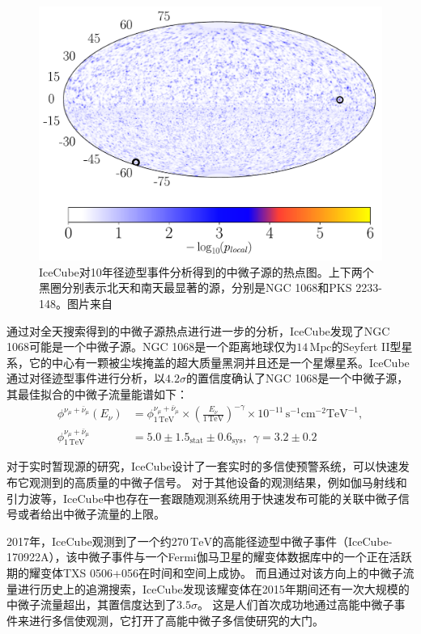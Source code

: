 \begin{figure}[htbp]
    \centering
    \includegraphics[width=0.6\linewidth]{img/IceCube_10yr_source_hotspot.pdf}
    \caption{IceCube对10年径迹型事件分析得到的中微子源的热点图。上下两个黑圈分别表示北天和南天最显著的源，分别是NGC 1068和PKS 2233-148。图片来自\parencite{IceCube_10yr_point_source:2019}}
    \label{fig:IceCube_10yr_source_hotspot}
\end{figure}

通过对全天搜索得到的中微子源热点进行进一步的分析，IceCube发现了NGC 1068可能是一个中微子源\cite{IceCube_NGC1068:2022}。NGC 1068是一个距离地球仅为$14\,\mathrm{Mpc}$的Seyfert II型星系，它的中心有一颗被尘埃掩盖的超大质量黑洞\cite{Rosas_NGC_1068:2021}并且还是一个星爆星系。IceCube通过对径迹型事件进行分析，以$4.2\sigma$的置信度确认了NGC 1068是一个中微子源，其最佳拟合的中微子流量能谱如下：
\begin{equation}
\begin{aligned}
    \phi^{\nu_\mu+\bar{\nu}_\mu}(E_\nu) &= 
    \phi^{\nu_\mu+\bar{\nu}_\mu}_\mathrm{1\,TeV} 
    \times \left( \frac{E_\nu}{1\,\mathrm{TeV}} \right)^{-\gamma} 
    \times 10^{-11} \, \mathrm{s^{-1} cm^{-2} TeV^{-1}}, \\
    \phi^{\nu_\mu+\bar{\nu}_\mu}_\mathrm{1\,TeV} &= 
    5.0 \pm 1.5_\mathrm{stat} \pm 0.6_\mathrm{sys}, ~~
    \gamma = 3.2 \pm 0.2
    \label{eq:spectrum_NGC1068}
\end{aligned}
\end{equation}

对于实时暂现源的研究，IceCube设计了一套实时的多信使预警系统\cite{IceCube_alert:2016, IceCube_alert:2019}，可以快速发布它观测到的高质量的中微子信号。
对于其他设备的观测结果，例如伽马射线和引力波等，IceCube中也存在一套跟随观测系统\cite{IceCube_follow_up:2020}用于快速发布可能的关联中微子信号或者给出中微子流量的上限。

2017年，IceCube观测到了一个约$270\,\mathrm{TeV}$的高能径迹型中微子事件（IceCube-170922A），该中微子事件与一个Fermi伽马卫星的耀变体数据库中的一个正在活跃期的耀变体TXS 0506+056在时间和空间上成协\cite{TXS_0506_MM:2018}。
而且通过对该方向上的中微子流量进行历史上的追溯搜索，IceCube发现该耀变体在2015年期间还有一次大规模的中微子流量超出，其置信度达到了$3.5\sigma$\cite{TXS_0506_flare:2018}。
这是人们首次成功地通过高能中微子事件来进行多信使观测，它打开了高能中微子多信使研究的大门。

